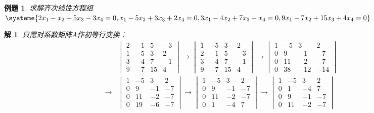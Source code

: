 \documentclass[a4paper]{book}
\newtheorem{eg}{例题}[chapter]
\newtheorem*{solution}{解}
\begin{document}
\vspace{1.5em}

\begin{eg}
求解齐次线性方程组
$\systeme{2x_1 - x_2 + 5x_3 - 3x_4 = 0, x_1 - 5x_2 + 3x_3 + 2x_4 = 0, 3x_1 - 4x_2 + 7x_3 - x_4 = 0, 9x_1 - 7x_2 + 15x_3 + 4x_4 = 0}$
\end{eg}
\begin{solution}
只需对系数矩阵$A$作初等行变换：
\begin{align*}
& \begin{vmatrix} 2 & -1 & 5 & -3 \\ 1 & -5 & 3 & 2 \\ 3 & -4 & 7 & -1 \\ 9 & -7 & 15 & 4 \end{vmatrix} \longrightarrow \begin{vmatrix} 1 & -5 & 3 & 2 \\ 2 & -1 & 5 & -3 \\ 3 & -4 & 7 & -1 \\ 9 & -7 & 15 & 4 \end{vmatrix} \longrightarrow \begin{vmatrix} 1 & -5 & 3 & 2 \\ 0 & 9 & -1 & -7 \\ 0 & 11 & -2 & -7 \\ 0 & 38 & -12 & -14 \end{vmatrix} \\
\longrightarrow & \begin{vmatrix} 1 & -5 & 3 & 2 \\ 0 & 9 & -1 & -7 \\ 0 & 11 & -2 & -7 \\ 0 & 19 & -6 & -7 \end{vmatrix} \longrightarrow \begin{vmatrix} 1 & -5 & 3 & 2 \\ 0 & 9 & -1 & -7 \\ 0 & 11 & -2 & -7 \\ 0 & 1 & -4 & 7 \end{vmatrix} \longrightarrow \begin{vmatrix} 1 & -5 & 3 & 2 \\ 0 & 1 & -4 & 7 \\ 0 & 9 & -1 & -7 \\ 0 & 11 & -2 & -7 \end{vmatrix} \\

\end{align*}
\end{solution}
\end{document}
